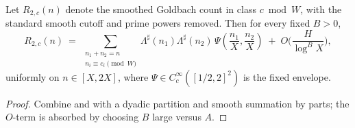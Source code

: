 \begin{corollary}\label{cor:LambdaToPrimes}
Let $R_{2,c}(n)$ denote the smoothed Goldbach count in class $c\bmod W$, with the standard smooth cutoff and prime powers removed. Then for every fixed $B>0$,
\[
R_{2,c}(n)\ =\ \sum_{\substack{n_1+n_2=n\\ n_i\equiv c_i\!\!\!\pmod W}}\!\!\Lambda^\sharp(n_1)\Lambda^\sharp(n_2)\,\Psi\!\left(\frac{n_1}{X},\frac{n_2}{X}\right)
\;+\;O\!\Big(\frac{H}{\log^{B}X}\Big),
\]
uniformly on $n\in[X,2X]$, where $\Psi\in C_c^\infty([1/2,2]^2)$ is the fixed envelope.
\end{corollary}

\begin{proof}
Combine  and  with a dyadic partition and smooth summation by parts; the $O$-term is absorbed by choosing $B$ large versus $A$.
\end{proof}
